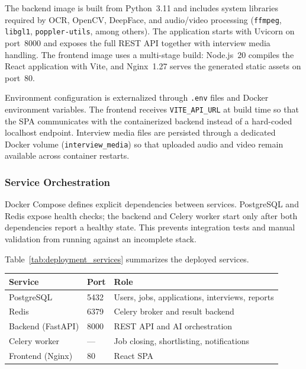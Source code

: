 The backend image is built from Python~3.11 and includes system libraries required by OCR, OpenCV, DeepFace, and audio/video processing (\texttt{ffmpeg}, \texttt{libgl1}, \texttt{poppler-utils}, among others). The application starts with Uvicorn on port~8000 and exposes the full REST API together with interview media handling. The frontend image uses a multi-stage build: Node.js~20 compiles the React application with Vite, and Nginx~1.27 serves the generated static assets on port~80.

Environment configuration is externalized through \texttt{.env} files and Docker environment variables. The frontend receives \texttt{VITE\_API\_URL} at build time so that the SPA communicates with the containerized backend instead of a hard-coded localhost endpoint. Interview media files are persisted through a dedicated Docker volume (\texttt{interview\_media}) so that uploaded audio and video remain available across container restarts.

\subsubsection{Service Orchestration}

Docker Compose defines explicit dependencies between services. PostgreSQL and Redis expose health checks; the backend and Celery worker start only after both dependencies report a healthy state. This prevents integration tests and manual validation from running against an incomplete stack.

Table~\ref{tab:deployment_services} summarizes the deployed services.

\begin{center}
\label{tab:deployment_services}
\renewcommand{\arraystretch}{1.15}
\begin{tabularx}{\textwidth}{|l|l|X|}
\hline
\rowcolor{gray!20} \textbf{Service} & \textbf{Port} & \textbf{Role} \\
\hline
PostgreSQL & 5432 & Users, jobs, applications, interviews, reports \\
\hline
Redis & 6379 & Celery broker and result backend \\
\hline
Backend (FastAPI) & 8000 & REST API and AI orchestration \\
\hline
Celery worker & --- & Job closing, shortlisting, notifications \\
\hline
Frontend (Nginx) & 80 & React SPA \\
\hline
\end{tabularx}
\end{center}

